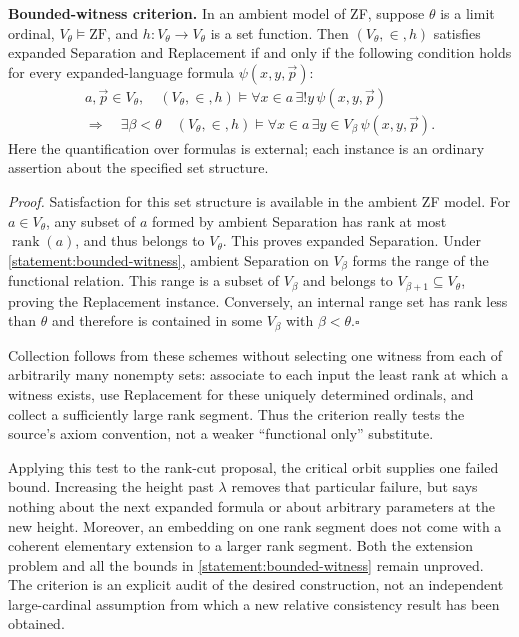 \documentclass[11pt]{article}
\begin{document}
\textbf{Bounded-witness criterion.}
In an ambient model of ZF, suppose $\theta$ is a limit ordinal,
$V_\theta\models\mathrm{ZF}$, and $h:V_\theta\to V_\theta$ is a set function.
Then $(V_\theta,\in,h)$ satisfies expanded Separation and Replacement if and
only if the following condition holds for every expanded-language formula
$\psi(x,y,\vec p)$:
\begin{equation}\label{statement:bounded-witness}
 \begin{gathered}
 a,\vec p\in V_\theta,\quad
 (V_\theta,\in,h)\models\forall x\in a\,\exists!y\,\psi(x,y,\vec p)
 \\[-2pt]
 \Longrightarrow\quad
 \exists\beta<\theta\quad
 (V_\theta,\in,h)\models
 \forall x\in a\,\exists y\in V_\beta\,\psi(x,y,\vec p).
 \end{gathered}
\end{equation}
Here the quantification over formulas is external; each instance is an
ordinary assertion about the specified set structure.

\emph{Proof.}
Satisfaction for this set structure is available in the ambient ZF model.
For $a\in V_\theta$, any subset of $a$ formed by ambient Separation has rank
at most $\operatorname{rank}(a)$, and thus belongs to $V_\theta$.  This proves
expanded Separation.  Under \eqref{statement:bounded-witness}, ambient Separation
on $V_\beta$ forms the range of the functional relation.  This range is a
subset of $V_\beta$ and belongs to $V_{\beta+1}\subseteq V_\theta$, proving
the Replacement instance.  Conversely, an internal range set has rank less
than $\theta$ and therefore is contained in some $V_\beta$ with
$\beta<\theta$.\hfill$\square$

Collection follows from these schemes without selecting one witness from
each of arbitrarily many nonempty sets: associate to each input the least
rank at which a witness exists, use Replacement for these uniquely determined
ordinals, and collect a sufficiently large rank segment.  Thus the criterion
really tests the source's axiom convention, not a weaker ``functional only''
substitute.

Applying this test to the rank-cut proposal, the critical orbit supplies one
failed bound.  Increasing the height past $\lambda$ removes that particular
failure, but says nothing about the next expanded formula or about arbitrary
parameters at the new height.  Moreover, an embedding on one rank segment
does not come with a coherent elementary extension to a larger rank segment.
Both the extension problem and all the bounds in
\eqref{statement:bounded-witness} remain unproved.  The criterion is an explicit
audit of the desired construction, not an independent large-cardinal
assumption from which a new relative consistency result has been obtained.
\end{document}
